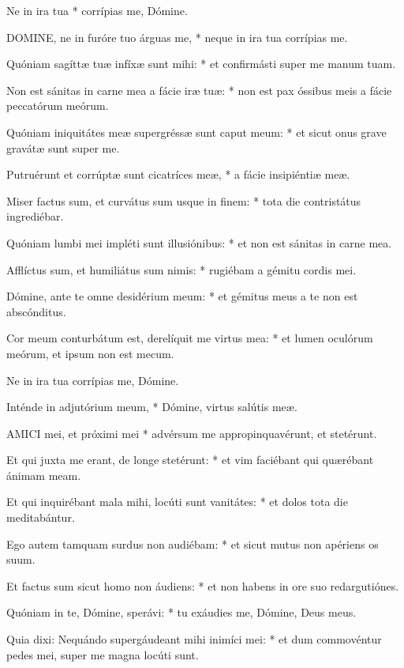  Ne in ira tua * corrípias me, Dómine.


\lettrine[lines=2]{D}{OMINE}, ne in furóre tuo árguas me, * neque in ira tua corrípias me.

Quóniam sagíttæ tuæ infíxæ sunt mihi: * et confirmásti super me manum tuam.

Non est sánitas in carne mea a fácie iræ tuæ: * non est pax óssibus meis a fácie peccatórum meórum.

Quóniam iniquitátes meæ supergréssæ sunt caput meum: * et sicut onus grave gravátæ sunt super me.

Putruérunt et corrúptæ sunt cicatríces meæ, * a fácie insipiéntiæ meæ.

Miser factus sum, et curvátus sum usque in finem: * tota die contristátus ingrediébar.

Quóniam lumbi mei impléti sunt illusiónibus: * et non est sánitas in carne mea.

Afflíctus sum, et humiliátus sum nimis: * rugiébam a gémitu cordis mei.

Dómine, ante te omne desidérium meum: * et gémitus meus a te non est abscónditus.

Cor meum conturbátum est, derelíquit me virtus mea: * et lumen oculórum meórum, et ipsum non est mecum.

 Ne in ira tua corrípias me, Dómine.

 Inténde in adjutórium meum, * Dómine, virtus salútis meæ.


\lettrine[lines=2]{A}{MICI} mei, et próximi mei * advérsum me appropinquavérunt, et stetérunt.

Et qui juxta me erant, de longe stetérunt: * et vim faciébant qui quærébant ánimam meam.

Et qui inquirébant mala mihi, locúti sunt vanitátes: * et dolos tota die meditabántur.

Ego autem tamquam surdus non audiébam: * et sicut mutus non apériens os suum.

Et factus sum sicut homo non áudiens: * et non habens in ore suo redargutiónes.

Quóniam in te, Dómine, sperávi: * tu exáudies me, Dómine, Deus meus.

Quia dixi: Nequándo supergáudeant mihi inimíci mei: * et dum commovéntur pedes mei, super me magna locúti sunt.

